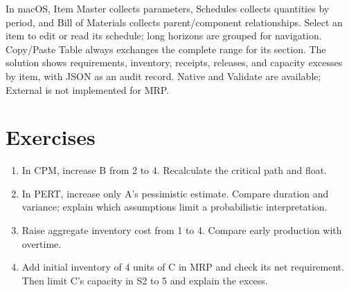 In macOS, Item Master collects parameters, Schedules collects quantities
by period, and Bill of Materials collects parent/component relationships.
Select an item to edit or read its schedule; long horizons are grouped for
navigation. Copy/Paste Table always exchanges the complete range for its
section. The solution shows requirements, inventory, receipts, releases,
and capacity excesses by item, with JSON as an audit record. Native and
Validate are available; External is not implemented for MRP.

\section{Exercises}
\begin{enumerate}
\item In CPM, increase B from 2 to 4. Recalculate the critical path and float.
\item In PERT, increase only A's pessimistic estimate. Compare duration and
      variance; explain which assumptions limit a probabilistic interpretation.
\item Raise aggregate inventory cost from 1 to 4. Compare early production
      with overtime.
\item Add initial inventory of 4 units of C in MRP and check its net
      requirement. Then limit C's capacity in S2 to 5 and explain the excess.
\end{enumerate}
